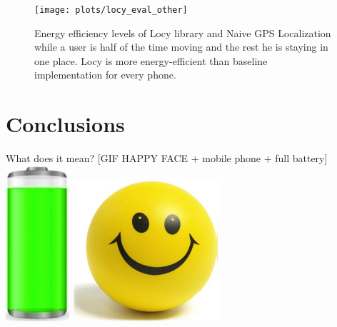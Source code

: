 \documentclass[a2,landscape]{a0poster}
\begin{document}
\begin{figure}[H]
\texttt{[image: plots/locy\_eval\_other]}
\caption{\label{p:locy_eval_other} \footnotesize{Energy efficiency levels of Locy library and Naive GPS Localization while a user is half of the time moving and the rest he is staying in one place. Locy is more energy-efficient than baseline implementation for every phone.} }
\end{figure}



\section*{Conclusions}
What does it mean?
[GIF HAPPY FACE + mobile phone + full battery]\\
\includegraphics[scale=0.7]{plots/full_battery}
\includegraphics[scale=0.7]{plots/happy_face}
\end{document}
